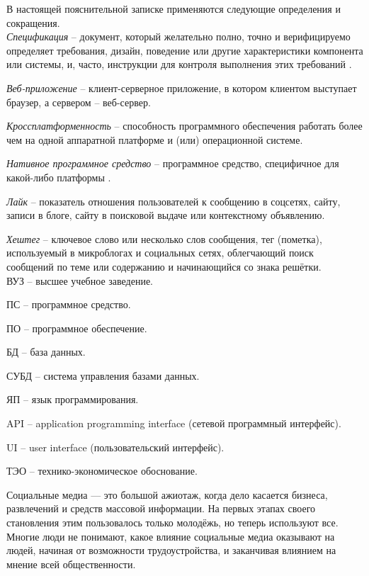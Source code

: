 \label{sec:definitions}

В настоящей пояснительной записке применяются следующие определения и сокращения.
\\

\emph{Спецификация} -- документ, который желательно полно, точно и верифицируемо определяет требования, дизайн, поведение или другие характеристики компонента или системы, и, часто, инструкции для контроля выполнения этих требований \cite{istqb_specification}.

\emph{Веб-приложение} -- клиент-серверное приложение, в котором клиентом выступает браузер, а сервером -- веб-сервер.

\emph{Кроссплатформенность} -- способность программного обеспечения работать более чем на одной аппаратной платформе и (или) операционной системе.

\emph{Нативное программное средство} -- программное средство, специфичное для какой-либо платформы \cite{habr_crossplatform}.

\emph{Лайк} -- показатель отношения пользователей к сообщению в соцсетях, сайту, записи в блоге, сайту в поисковой выдаче или контекстному объявлению.

\emph{Хештег} -- ключевое слово или несколько слов сообщения, тег (пометка), используемый в микроблогах и социальных сетях, облегчающий поиск сообщений по теме или содержанию и начинающийся со знака решётки.
\\

ВУЗ -- высшее учебное заведение.

ПС -- программное средство.

ПО -- программное обеспечение.

БД -- база данных.

СУБД -- система управления базами данных.

ЯП -- язык программирования.

API -- application programming interface (сетевой программный интерфейс).

UI -- user interface (пользовательский интерфейс).

ТЭО -- технико-экономическое обоснование.


\label{sec:introduction}

Социальные медиа — это большой ажиотаж, когда дело касается
бизнеса, развлечений и средств массовой информации. На первых этапах
своего становления этим пользовалось только молодёжь, но теперь
используют все. Многие люди не понимают, какое влияние социальные
медиа оказывают на людей, начиная от возможности трудоустройства, и
заканчивая влиянием на мнение всей общественности.

